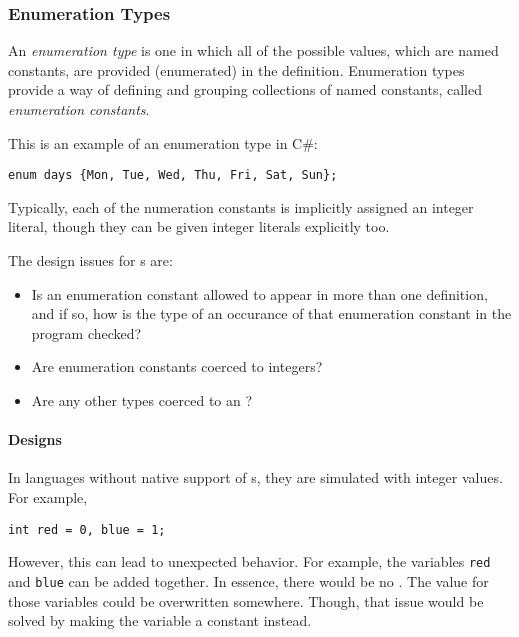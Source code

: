 \subsubsection{Enumeration Types}\label{subsubsec:Enumeration_Types}
\begin{definition}\label{def:Enumeration_Type}
  An \emph{enumeration type} is one in which all of the possible values, which are named constants, are provided (enumerated) in the definition.
  Enumeration types provide a way of defining and grouping collections of named constants, called \emph{enumeration constants}.

  This is an example of an enumeration type in C\#:
\begin{verbatim}
enum days {Mon, Tue, Wed, Thu, Fri, Sat, Sun};
\end{verbatim}

  \begin{remark}
    Typically, each of the numeration constants is implicitly assigned an integer literal, though they can be given integer literals explicitly too.
  \end{remark}
\end{definition}

The design issues for s are:
\begin{itemize}[noitemsep]
\item Is an enumeration constant allowed to appear in more than one  definition, and if so, how is the type of an occurance of that enumeration constant in the program checked?
\item Are enumeration constants coerced to integers?
\item Are any other types coerced to an ?
\end{itemize}

\paragraph{Designs}\label{par:Enumeration_Types_Designs}
In languages without native support of s, they are simulated with integer values.
For example,
\begin{verbatim}
int red = 0, blue = 1;
\end{verbatim}

However, this can lead to unexpected behavior.
For example, the variables \texttt{red} and \texttt{blue} can be added together.
In essence, there would be no .
The value for those variables could be overwritten somewhere.
Though, that issue would be solved by making the variable a constant instead.

